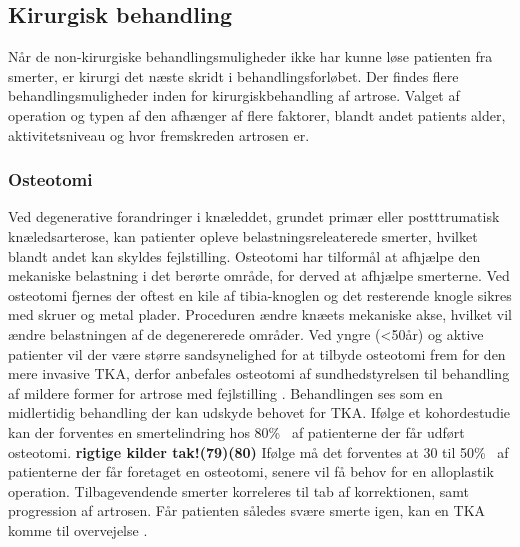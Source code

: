 
%

\subsection{Kirurgisk behandling}

Når de non-kirurgiske behandlingsmuligheder ikke har kunne løse patienten fra smerter, er kirurgi det næste skridt i behandlingsforløbet. Der findes flere behandlingsmuligheder inden for kirurgiskbehandling af artrose. Valget af operation og typen af den afhænger af flere faktorer, blandt andet patients alder, aktivitetsniveau og hvor fremskreden artrosen er.

\subsubsection{Osteotomi}
Ved degenerative forandringer i knæleddet, grundet primær eller postttrumatisk knæledsarterose, kan patienter opleve belastningsreleaterede smerter, hvilket blandt andet kan skyldes fejlstilling. Osteotomi har tilformål at afhjælpe den mekaniske belastning i det berørte område, for derved at afhjælpe smerterne. Ved osteotomi fjernes der oftest en kile af tibia-knoglen og det resterende knogle sikres med skruer og metal plader. Proceduren ændre knæets mekaniske akse, hvilket vil ændre belastningen af de degenererede områder. \citep{Osteotomi_og_TKA} Ved yngre (<50år) og aktive patienter vil der være større sandsynelighed for at tilbyde osteotomi frem for den mere invasive TKA, derfor anbefales osteotomi af sundhedstyrelsen til behandling af mildere former for artrose med fejlstilling \citep{Osteotomi_og_TKA} \citep{brostrom2012}. Behandlingen ses som en midlertidig behandling der kan udskyde behovet for TKA. Ifølge et kohordestudie kan der forventes en smertelindring hos 80\%~ af patienterne der får udført osteotomi. \textbf{rigtige kilder tak!(79)(80)} Ifølge \cite{brostrom2012} må det forventes at 30 til 50\%~ af patienterne der får foretaget en osteotomi, senere vil få behov for en alloplastik operation. \citep{brostrom2012} Tilbagevendende smerter korreleres til tab af korrektionen, samt progression af artrosen. Får patienten således svære smerte igen, kan en TKA komme til overvejelse \citep{Osteotomi_og_TKA}. 


